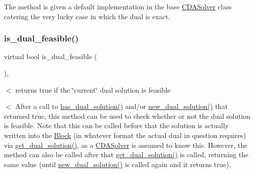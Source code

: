 The method is given a default implementation in the base \mbox{\hyperlink{class_s_m_spp__di__unipi__it_1_1_c_d_a_solver}{C\+D\+A\+Solver}} class catering the very lucky case in which the dual is exact. \mbox{\label{class_s_m_spp__di__unipi__it_1_1_c_d_a_solver_a974e986ce1a04d44660bb5c573e8315d}} 
\subsubsection{\texorpdfstring{is\+\_\+dual\+\_\+feasible()}{is\_dual\_feasible()}}
{\footnotesize\ttfamily virtual bool is\+\_\+dual\+\_\+feasible (\begin{DoxyParamCaption}\item[{void}]{ }\end{DoxyParamCaption})\hspace{0.3cm}{\ttfamily [inline]}, {\ttfamily [virtual]}}



$<$ returns true if the \char`\"{}current\char`\"{} dual solution is feasible 

$<$ After a call to \mbox{\hyperlink{class_s_m_spp__di__unipi__it_1_1_c_d_a_solver_a26970b0da7f4f7b56bcfc890983d9a40}{has\+\_\+dual\+\_\+solution()}} and/or \mbox{\hyperlink{class_s_m_spp__di__unipi__it_1_1_c_d_a_solver_a8c650415b6673c33692c363abdfdef00}{new\+\_\+dual\+\_\+solution()}} that returned true, this method can be used to check whether or not the dual solution is feasible. Note that this can be called before that the solution is actually written into the \mbox{\hyperlink{class_s_m_spp__di__unipi__it_1_1_block}{Block}} (in whatever format the actual dual in question requires) via \mbox{\hyperlink{class_s_m_spp__di__unipi__it_1_1_c_d_a_solver_a347d37171494bf83416a48b279b94d5a}{get\+\_\+dual\+\_\+solution()}}, as a \mbox{\hyperlink{class_s_m_spp__di__unipi__it_1_1_c_d_a_solver}{C\+D\+A\+Solver}} is assumed to know this. However, the method can also be called after that \mbox{\hyperlink{class_s_m_spp__di__unipi__it_1_1_c_d_a_solver_a347d37171494bf83416a48b279b94d5a}{get\+\_\+dual\+\_\+solution()}} is called, returning the same value (until \mbox{\hyperlink{class_s_m_spp__di__unipi__it_1_1_c_d_a_solver_a8c650415b6673c33692c363abdfdef00}{new\+\_\+dual\+\_\+solution()}} is called again and it returns true).


